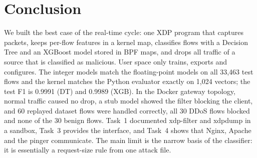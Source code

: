\chapter{Conclusion}\label{chap:conclusion}

We built the best case of the real-time cycle: one XDP program that captures packets, keeps per-flow features in a kernel map, classifies flows with a Decision Tree and an XGBoost model stored in BPF maps, and drops all traffic of a source that is classified as malicious. User space only trains, exports and configures. The integer models match the floating-point models on all 33,463 test flows and the kernel matches the Python evaluator exactly on 1,024 vectors; the test F1 is 0.9991 (DT) and 0.9989 (XGB). In the Docker gateway topology, normal traffic caused no drop, a stub model showed the filter blocking the client, and 60 replayed dataset flows were handled correctly, all 30 DDoS flows blocked and none of the 30 benign flows. Task~1 documented xdp-filter and xdpdump in a sandbox, Task~3 provides the interface, and Task~4 shows that Nginx, Apache and the pinger communicate. The main limit is the narrow basis of the classifier: it is essentially a request-size rule from one attack file.
